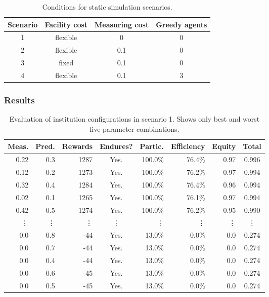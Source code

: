 \begin{table}
\centering
\caption{Conditions for static simulation scenarios.}\label{tab:scenarios}
\begin{tabular}{c||c|c|c}
Scenario & Facility cost & Measuring cost & Greedy agents \\
\hline
1 & flexible & 0 & 0 \\
2 & flexible & 0.1 & 0 \\
3 & fixed & 0.1 & 0 \\
4 & flexible & 0.1 & 3 \\
\end{tabular}
\end{table}

\subsubsection*{Results}

\begin{table}
\centering
\caption[Evaluation of institution configurations in scenario 1.]{Evaluation of institution configurations in scenario 1. Shows only best and worst five parameter combinations.}\label{tab:static0}
\begin{tabular}{rr|rcrrr|c}
Meas. & Pred. & Rewards & Endures? & Partic. & Efficiency & Equity & Total \\
\hline
0.22 & 0.3 & 1287 & Yes. & 100.0\% & 76.4\% & 0.97 & 0.996 \\
0.12 & 0.2 & 1273 & Yes. & 100.0\% & 76.2\% & 0.97 & 0.994 \\
0.32 & 0.4 & 1284 & Yes. & 100.0\% & 76.4\% & 0.96 & 0.994 \\
0.02 & 0.1 & 1265 & Yes. & 100.0\% & 76.1\% & 0.97 & 0.994 \\
0.42 & 0.5 & 1274 & Yes. & 100.0\% & 76.2\% & 0.95 & 0.990 \\
\vdots & \vdots & \vdots & \vdots & \vdots & \vdots & \vdots & \vdots \\
0.0 & 0.8 & -44 & Yes. & 13.0\% & 0.0\% & 0.0 & 0.274 \\
0.0 & 0.7 & -44 & Yes. & 13.0\% & 0.0\% & 0.0 & 0.274 \\
0.0 & 0.4 & -44 & Yes. & 13.0\% & 0.0\% & 0.0 & 0.274 \\
0.0 & 0.6 & -45 & Yes. & 13.0\% & 0.0\% & 0.0 & 0.274 \\
0.0 & 0.5 & -45 & Yes. & 13.0\% & 0.0\% & 0.0 & 0.274 \\
\end{tabular}
\end{table}

